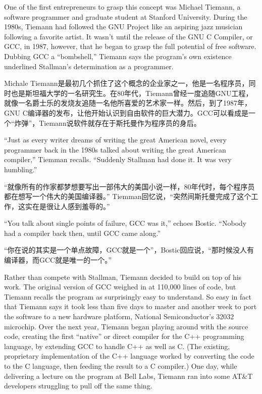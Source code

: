 \ifdefined\eng
One of the first entrepreneurs to grasp this concept was Michael Tiemann, a software programmer and graduate student at Stanford University. During the 1980s, Tiemann had followed the GNU Project like an aspiring jazz musician following a favorite artist. It wasn't until the release of the GNU C Compiler, or GCC, in 1987, however, that he began to grasp the full potential of free software. Dubbing GCC a ``bombshell,'' Tiemann says the program's own existence underlined Stallman's determination as a programmer.
\fi

\ifdefined\chs
Michale Tiemann是最初几个抓住了这个概念的企业家之一，他是一名程序员，同时也是斯坦福大学的一名研究生。在80年代，Tiemann曾经一度追随GNU工程，就像一名爵士乐的发烧友追随一名他所喜爱的艺术家一样。然后，到了1987年，GNU C编译器的发布，让他开始认识到自由软件的巨大潜力。GCC可以看成是一个“炸弹”，Tiemann说软件就存在于斯托曼作为程序员的身后。
\fi

\ifdefined\eng
``Just as every writer dreams of writing the great American novel, every programmer back in the 1980s talked about writing the great American compiler,'' Tiemman recalls. ``Suddenly Stallman had done it. It was very humbling.''
\fi

\ifdefined\chs
“就像所有的作家都梦想要写出一部伟大的美国小说一样，80年代时，每个程序员都在想写一个伟大的美国编译器。” Tiemman回忆说，“突然间斯托曼完成了这个工作，这实在是很让人感到羞辱的。”
\fi

\ifdefined\eng
``You talk about single points of failure, GCC was it,'' echoes Bostic. ``Nobody had a compiler back then, until GCC came along.''
\fi

\ifdefined\chs
“你在说的其实是一个单点故障，GCC就是一个”，Bostic回应说，“那时候没人有编译器，而GCC就是唯一的一个。”
\fi

\ifdefined\eng
Rather than compete with Stallman, Tiemann decided to build on top of his work. The original version of GCC weighed in at 110,000 lines of code, but Tiemann recalls the program as surprisingly easy to understand. So easy in fact that Tiemann says it took less than five days to master and another week to port the software to a new hardware platform, National Semiconductor's 32032 microchip. Over the next year, Tiemann began playing around with the source code, creating the first ``native'' or direct compiler for the C++ programming language, by extending GCC to handle C++ as well as C. (The existing, proprietary implementation of the C++ language worked by converting the code to the C language, then feeding the result to a C compiler.) One day, while delivering a lecture on the program at Bell Labs, Tiemann ran into some AT\&T developers struggling to pull off the same thing.
\fi

